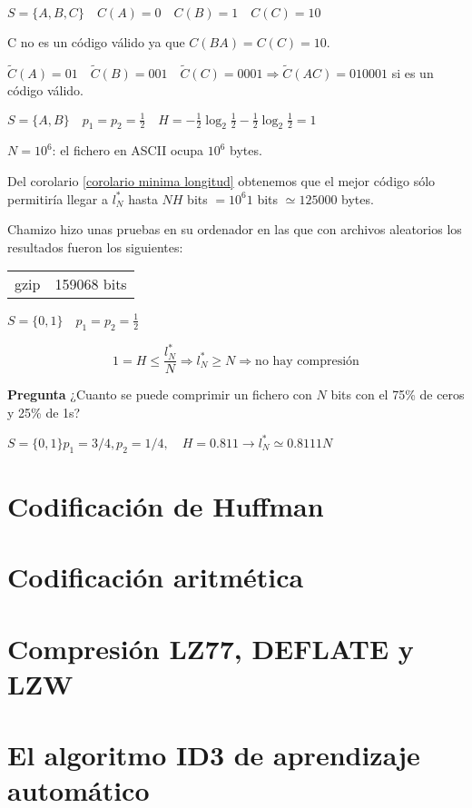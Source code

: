 	\begin{example}

		$S = \{A,B,C\} \quad C(A) = 0 \quad C(B) = 1 \quad C(C) = 10$

		C no es un código válido ya que $C(BA) = C(C) = 10$.

		$\widetilde{C}(A) = 01 \quad \widetilde{C}(B) = 001 \quad \widetilde{C}(C) = 0001 \Rightarrow \widetilde{C}(AC) = 010001 $ si es un código válido.

	\end{example}


	\begin{example}


		$S = \{A,B\} \quad p_1 = p_2 = \frac{1}{2} \quad H = -\frac{1}{2} \log_2 \frac{1}{2} - \frac{1}{2} \log_2 \frac{1}{2} = 1$

		$N = 10^6$: el fichero en ASCII ocupa $10^6$ bytes.

		Del corolario \ref{corolario minima longitud} obtenemos que el mejor código sólo permitiría llegar a $l^*_N$ hasta $NH$ bits $= 10^6 1$ bits $\simeq 125000$ bytes.

		Chamizo hizo unas pruebas en su ordenador en las que con archivos aleatorios los resultados fueron los siguientes:

		\begin{table}[h]
			\begin{tabular}{r|c}
			gzip & 159068 bits
			\end{tabular}
		\end{table}


	\end{example}


	\begin{example}

		$S = \{0,1\} \quad p_1 = p_2 = \frac{1}{2}$

		$$ 1 = H \leq \frac{l^*_N}{N} \Rightarrow l^*_N \geq N \Rightarrow \text{no hay compresión} $$

	\end{example}


	\textbf{Pregunta} ¿Cuanto se puede comprimir un fichero con $N$ bits con el 75\% de ceros y 25\% de 1s? 

	$ S= \{0,1\} p_1 = 3/4, p_2 = 1/4, \quad H = 0.811 \rightarrow  l^*_N \simeq 0.8111 N $

\section{Codificación de Huffman}
\section{Codificación aritmética}
\section{Compresión LZ77, DEFLATE y LZW}
\section{El algoritmo ID3 de aprendizaje automático}

